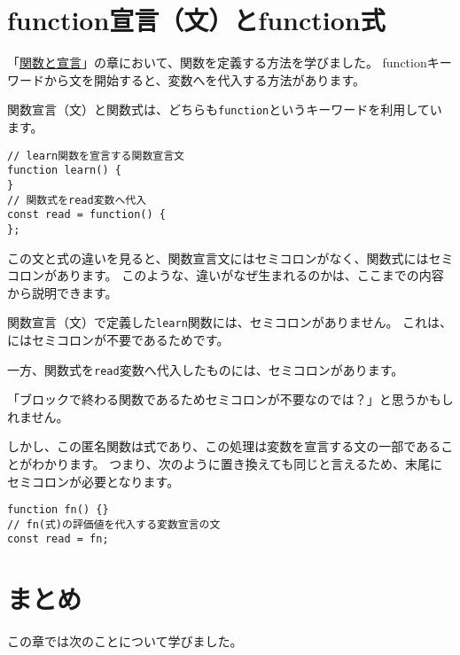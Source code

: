 \hypertarget{function-statement-and-function-expression}{%
\section{function宣言（文）とfunction式}\label{function-statement-and-function-expression}}

「\hyperlink{function-and-declaration}{関数と宣言}」の章において、関数を定義する方法を学びました。
functionキーワードから文を開始する\textbf{}と、変数へ\textbf{}を代入する方法があります。

関数宣言（文）と関数式は、どちらも\texttt{function}というキーワードを利用しています。

\begin{lstlisting}
// learn関数を宣言する関数宣言文
function learn() {
}
// 関数式をread変数へ代入
const read = function() {
};
\end{lstlisting}

この文と式の違いを見ると、関数宣言文にはセミコロンがなく、関数式にはセミコロンがあります。
このような、違いがなぜ生まれるのかは、ここまでの内容から説明できます。

関数宣言（文）で定義した\texttt{learn}関数には、セミコロンがありません。
これは、\textbf{}にはセミコロンが不要であるためです。

一方、関数式を\texttt{read}変数へ代入したものには、セミコロンがあります。

「ブロックで終わる関数であるためセミコロンが不要なのでは？」と思うかもしれません。

しかし、この匿名関数は式であり、この処理は変数を宣言する文の一部であることがわかります。
つまり、次のように置き換えても同じと言えるため、末尾にセミコロンが必要となります。\enlargethispage{\baselineskip}\enlargethispage{\baselineskip}

\begin{lstlisting}
function fn() {}
// fn(式)の評価値を代入する変数宣言の文
const read = fn;
\end{lstlisting}

\hypertarget{statement-expression-summary}{%
\section{まとめ}\label{statement-expression-summary}}

この章では次のことについて学びました。

